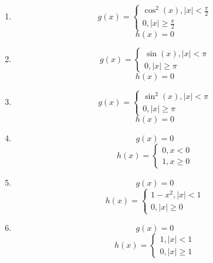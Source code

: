\documentclass{article}
\theoremstyle{definition}
\newenvironment{boldenv}{\bfseries\boldmath}{}
\begin{document}
\begin{boldenv}
\begin{enumerate}[start=7, resume*=problems]
        \item \begin{equation*}
        g(x) =
        \begin{cases}
            \cos^2{(x)}, |x|<\frac{\pi}{2}\\
            0, |x|\geq\frac{\pi}{2}
        \end{cases}
        \end{equation*}
        \[h(x) = 0\]
        
        \item \begin{equation*}
        g(x) =
        \begin{cases}
            \sin{(x)}, |x|<\pi\\
            0, |x|\geq\pi
        \end{cases}
        \end{equation*}
        \[h(x) = 0\]
        
        \item \begin{equation*}
        g(x) =
        \begin{cases}
            \sin^2{(x)}, |x|<\pi\\
            0, |x|\geq\pi
        \end{cases}
        \end{equation*}
        \[h(x) = 0\]
        
        \item
        \[g(x) = 0\] \begin{equation*}
        h(x) =
        \begin{cases}
            0, x<0\\
            1, x\geq0
        \end{cases}
        \end{equation*}
        
        \item
        \[g(x) = 0\] \begin{equation*}
        h(x) =
        \begin{cases}
            1-x^2, |x|<1\\
            0, |x|\geq0
        \end{cases}
        \end{equation*}
        
        \item
        \[g(x) = 0\] \begin{equation*}
        h(x) =
        \begin{cases}
            1, |x|<1\\
            0, |x|\geq1
        \end{cases}
        \end{equation*}
        

\end{enumerate}
\end{boldenv}
\end{document}
